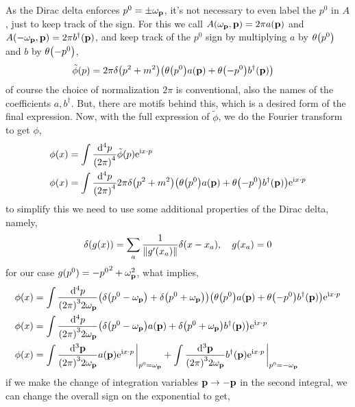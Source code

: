 As the Dirac delta enforces $p^0=\pm\omega_{\vb p}$, it's not necessary to even label the $p^0$ in $A$, just 
to keep track of the sign. For this we call $A\qty(\omega_{\vb p},\vb p)=2\pi a\qty(\vb p)$ and 
$A\qty(-\omega_{\vb p},\vb p)=2\pi b^\dagger\qty(\vb p)$, and keep track of the $p^0$ sign by multiplying 
$a$ by $\theta\qty(p^0)$ and $b$ by $\theta\qty(-p^0)$,
\begin{align}
    \tilde\phi\qty(p)&=2\pi\delta\qty(p^2+m^2)\qty(\theta\qty(p^0)a\qty(\vb p)+\theta\qty(-p^0)b^\dagger\qty(\vb p))
\end{align}
of course the choice of normalization $2\pi$ is conventional, also the names of the coefficients $a, b^\dagger$. But, 
there are motifs behind this, which is a desired form of the final expression. Now, with the full expression of $\tilde\phi$, 
we do the Fourier transform to get $\phi$,
\begin{align}
    \phi\qty(x)&=\int\frac{\dd[4]{p}}{\qty(2\pi)^4}\tilde \phi\qty(p)\textnormal{e}^{\textnormal{i} x\cdot p}\\
    \phi\qty(x)&=\int\frac{\dd[4]{p}}{\qty(2\pi)^4}2\pi\delta\qty(p^2+m^2)\qty(\theta\qty(p^0)a\qty(\vb p)+\theta\qty(-p^0)b^\dagger\qty(\vb p))\textnormal{e}^{\textnormal{i} x\cdot p}
\end{align}
to simplify this we need to use some additional properties of the Dirac delta, namely,
\begin{align}
    \delta\qty(g(x)) = \sum\limits_{a}\frac{1}{\norm{g'\qty(x_a)}}\delta\qty(x-x_a),\ \ \ g(x_a) = 0
\end{align}
for our case $g(p^0) = -{p^0}^2+\omega_{\vb p}^2$, what implies,
\begin{align}
    \phi\qty(x)&=\int\frac{\dd[4]{p}}{\qty(2\pi)^32\omega_{\vb p}}\qty(\delta\qty(p^0-\omega_{\vb p})+\delta\qty(p^0+\omega_{\vb p}))\qty(\theta\qty(p^0)a\qty(\vb p)+\theta\qty(-p^0)b^\dagger\qty(\vb p))\e^{\im x\cdot p}\\
    \phi\qty(x)&=\int\frac{\dd[4]{p}}{\qty(2\pi)^32\omega_{\vb p}}\qty(\delta\qty(p^0-\omega_{\vb p})a\qty(\vb p)+\delta\qty(p^0+\omega_{\vb p})b^\dagger\qty(\vb p))\e^{\im x\cdot p}\\
    \phi\qty(x)&=\int\frac{\dd[3]{\vb p}}{\qty(2\pi)^32\omega_{\vb p}}a\qty(\vb p)\e^{\im x\cdot p}\eval_{p^0=\omega_{\vb p}}+\int\frac{\dd[3]{\vb p}}{\qty(2\pi)^32\omega_{\vb p}}b^\dagger\qty(\vb p)\e^{\im x\cdot p}\eval_{p^0=-\omega_{\vb p}}
\end{align}
if we make the change of integration variables $\vb p\rightarrow-\vb p$ in the second integral, we can change the overall sign on the exponential to get,
